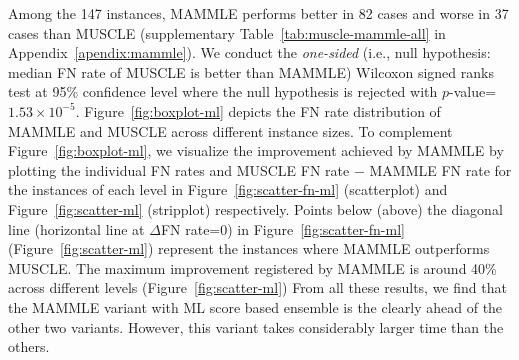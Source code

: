 Among the 147 instances, MAMMLE performs better in 82 cases and worse in 37 cases than MUSCLE (supplementary Table~\ref{tab:muscle-mammle-all} in Appendix~\ref{apendix:mammle}). We conduct the \textit{one-sided} (i.e., null hypothesis: median FN rate of MUSCLE is better than MAMMLE) Wilcoxon signed ranks test at 95\% confidence level where the null hypothesis is rejected with $p$-value=$1.53\times10^{-5}$. 
Figure~\ref{fig:boxplot-ml} depicts the FN rate distribution of MAMMLE and MUSCLE across different instance sizes. 
To complement Figure~\ref{fig:boxplot-ml}, we visualize the improvement achieved by MAMMLE by plotting the individual FN rates and MUSCLE FN rate $-$ MAMMLE FN rate for the instances of each level in Figure~\ref{fig:scatter-fn-ml} (scatterplot) and Figure~\ref{fig:scatter-ml} (stripplot) respectively. Points below (above) the diagonal line (horizontal line at $\Delta$FN rate=0) in Figure~\ref{fig:scatter-fn-ml} (Figure~\ref{fig:scatter-ml}) represent the instances where MAMMLE outperforms MUSCLE. The maximum improvement registered by MAMMLE is around 40\% across different levels (Figure~\ref{fig:scatter-ml})
From all these results, we find that the MAMMLE variant with ML score based ensemble is the clearly ahead of the other two variants. However, this variant takes considerably larger time than the others.
